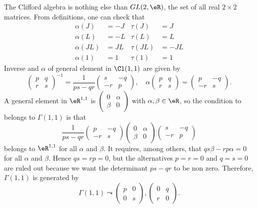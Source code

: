 The Clifford algebra is nothing else than $GL(2,\eR)$, the set of all real $2\times 2$ matrices. From definitions, one can check that
\[ 
 \begin{aligned} 
\alpha(J)&=-J   &\tau(J)&=J\\
\alpha(L)&=-L   &\tau(L)&=L\\
\alpha(JL)&=JL  &\tau(JL)&=-JL\\
\alpha(1)&=1    &\tau(1)&=1
\end{aligned}
\]
Inverse and $\alpha$ of general element in $\Cl(1,1)$ are given by
\[ 
  \begin{pmatrix}
p&q\\r&s
\end{pmatrix}^{-1}=
\frac{1}{ ps-qr }\begin{pmatrix}
s&-q\\-r&p
\end{pmatrix},\quad
\alpha\begin{pmatrix}
p&q\\r&s
\end{pmatrix}=
\begin{pmatrix}
p&-q\\-r&s
\end{pmatrix}.
\]
A general element in $\eR^{1,1}$ is $\begin{pmatrix}
0&\alpha\\\beta&0
\end{pmatrix}$ with $\alpha,\beta\in\eR$, so the condition to belongs to $\Gamma(1,1)$ is that 
\[ 
  \frac{1}{ ps-qr }\begin{pmatrix}
p&-q\\-r&s
\end{pmatrix}
\begin{pmatrix}
0&\alpha\\\beta&0
\end{pmatrix}
\begin{pmatrix}
s&-q\\-r&p
\end{pmatrix}
\]
belongs to $\eR^{1,1}$ for all $\alpha$ and $\beta$. It requires, among others, that $qs\beta-rp\alpha=0$ for all $\alpha$ and $\beta$. Hence $qs=rp=0$, but the alternatives $p=r=0$ and $q=s=0$ are ruled out because we want the determinant $ps-qr$ to be non zero. Therefore, $\Gamma(1,1)$ is generated by
\[ 
  \Gamma(1,1)\leadsto
\begin{pmatrix}
p&0\\0&s
\end{pmatrix},\begin{pmatrix}
0&q\\r&0
\end{pmatrix}.
\]
